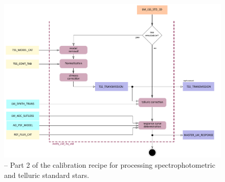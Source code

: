 \begin{figure}[ht]
  \centering
  \includegraphics[width=0.4\textheight]{figures/metis_lm_lss_std_v0.8_part_2.pdf}
  \caption[Recipe: ]{ --
    Part 2 of the calibration recipe for processing spectrophotometric and telluric standard stars.}
  \label{Fig:rec_lm_lss_flux2}
\end{figure}
\clearpage
